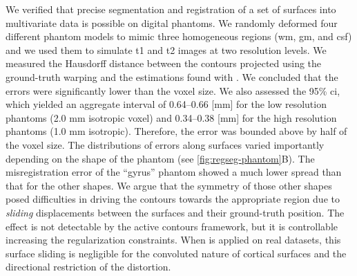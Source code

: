 We verified that precise segmentation and registration of a set of surfaces into multivariate
  data is possible on digital phantoms.
We randomly deformed four different phantom models to mimic three homogeneous regions
  (\gls*{wm}, \gls*{gm}, and \acrlong*{csf}) and we used them to simulate \gls*{t1}
  and \gls*{t2} images at two resolution levels.
We measured the Hausdorff distance between the contours projected using the
  ground-truth warping and the estimations found with \regseg{}.
We concluded that the errors were significantly lower than the voxel size.
We also assessed the 95\% \gls*{ci}, which yielded an aggregate interval of
  0.64--0.66 [mm] for the low resolution phantoms (2.0 mm isotropic voxel) and
  0.34--0.38 [mm] for the high resolution phantoms (1.0 mm isotropic).
Therefore, the error was bounded above by half of the voxel size.
The distributions of errors along surfaces varied importantly depending on the shape of the
  phantom (see \autoref{fig:regseg-phantom}B).
The misregistration error of the ``gyrus'' phantom showed a much lower spread than that
  for the other shapes.
We argue that the symmetry of those other shapes posed difficulties in driving the contours
  towards the appropriate region due to \emph{sliding} displacements between the
  surfaces and their ground-truth position.
The effect is not detectable by the active contours framework, but it is controllable
  increasing the regularization constraints.
When \regseg{} is applied on real datasets, this surface sliding is negligible for the
  convoluted nature of cortical surfaces and the directional restriction of the
  distortion.

